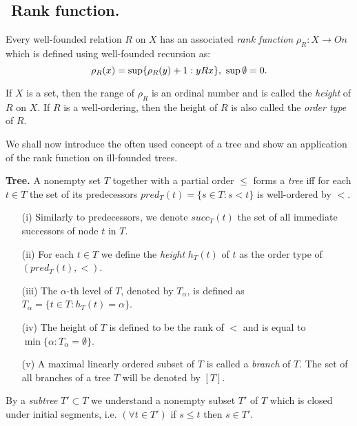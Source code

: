
\subsection{${}$ \hspace{-1em}Rank function.}
Every well-founded relation $R$ on $X$ has an associated
\emph{rank function} $\rho_R:X\to On$ which
is defined using well-founded recursion as:
$$ %
 \rho_R(x)=\hbox{sup}\{\rho_R(y)+1:y R x\},\ \sup \emptyset = 0.
$$ %

\smallskip

If $X$ is a set, then the range of $\rho_R$ is an ordinal number and is called the \emph{height} of $R$ on $X$.
If $R$ is a well-ordering, then the height of $R$ is also called the \emph{order type} of $R$.

\smallskip

We shall now introduce the often used concept of a tree and show an application of the rank function on ill-founded trees.


\begin{definition}\label{tree}
{\bf Tree.} A nonempty set $T$ together with a partial order $\leq$ forms a \emph{tree} iff
for each $t\in T$ the set of its predecessors $pred_T(t)=\{s\in T:s< t\}$ is well-ordered by $<$.
\begin{itemize}
 \item[(i)] Similarly to predecessors, we denote $succ_T(t)$ the set of all immediate successors of node $t$ in $T$.
 \item[(ii)] For each $t\in T$ we define the \emph{height} $h_T(t)$ of $t$ as the order type of $(pred_T(t),<)$.
 \item[(iii)] The $\alpha$-th level of $T$, denoted by $T_\alpha$,  is defined as $T_\alpha=\{t\in T:h_T(t)=\alpha\}$.
 \item[(iv)] The height of $T$ is defined to be the rank of $<$ and is equal to $\min\{\alpha:T_\alpha=\emptyset\}$.
 \item[(v)] A maximal linearly ordered subset of $T$ is called a \emph{branch} of $T$. The set of all branches of a tree $T$ will be denoted by $[T]$.
\end{itemize}

\smallskip

By a \emph{subtree} $T' \subset T$ we understand a nonempty subset $T'$ of $T$
which is closed under initial segments, i.e. $(\forall t \in T')$ if $s \leq t$ then $s \in T'$.
\end{definition}


